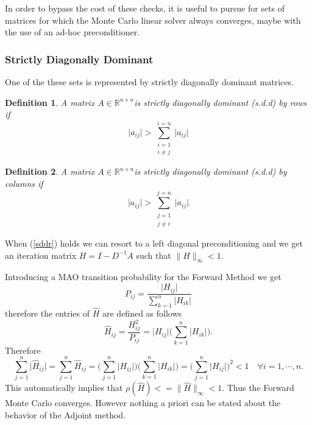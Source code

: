\documentclass[a4paper,10pt]{article}
\newtheorem{defn}{Definition}
\begin{document}
In order to bypass the cost of these checks, it is useful to pursue for sets of
matrices for
which the Monte Carlo linear solver always converges, maybe with the use of an
ad-hoc preconditioner.

\subsubsection{Strictly Diagonally Dominant}

 One of the these sets is
represented by strictly diagonally dominant matrices.

\begin{defn}
 A matrix $A\in\mathbb{R}^{n\times n}$is strictly diagonally dominant (s.d.d)
by rows if
 \begin{equation}
    \lvert a_{ij}\rvert>\sum_{\substack{i=1\\ i\ne j}}^{i=n}\lvert
a_{ij}\rvert
\label{sddr}
 \end{equation}
\end{defn}

\begin{defn}
 A matrix $A\in\mathbb{R}^{n\times n}$is strictly diagonally dominant (s.d.d)
by columns if
 \begin{equation}
    \lvert a_{ij}\rvert>\sum_{\substack{j=1\\ j\ne i}}^{j=n}\lvert
a_{ij}\rvert
\label{sddc}
 \end{equation}
\end{defn}

When (\ref{sddr}) holds we can resort to a left diagonal preconditioning and we
get an iteration matrix $H=I-D^{-1}A$ such that $\lVert H \rVert_{\infty}<1$.

Introducing a MAO transition probability for the Forward Method we get
\[
 P_{ij}=\frac{\lvert H_{ij}\rvert}{\sum_{k=1}^n\lvert H_{ik}\rvert}
\]
therefore the entries of $\hat{H}$ are defined as follows
\[
 \hat{H}_{ij}=\frac{H^2_{ij}}{P_{ij}}=\lvert H_{ij}\rvert\bigg
(\sum_{k=1}^n\lvert
H_{ik}\rvert\bigg ).
\]
Therefore
\[
 \sum_{j=1}^n\lvert \hat{H}_{ij} \rvert = \sum_{j=1}^n \hat{H}_{ij} =\bigg
(\sum_{j=1}^n \lvert H_{ij}\rvert\bigg )\bigg (\sum_{k=1}^n\lvert
H_{ik}\rvert\bigg ) =\bigg
(\sum_{j=1}^n \lvert H_{ij}\rvert\bigg ) ^2 <1 \quad \forall i=1,\cdots, n.
\]
This automatically implies that $\rho(\hat{H})<=\lVert
\hat{H}\rVert_{\infty}<1$. Thus the Forward Monte Carlo converges.
However nothing a priori can be
stated about the behavior of the Adjoint method.\newline
\end{document}
